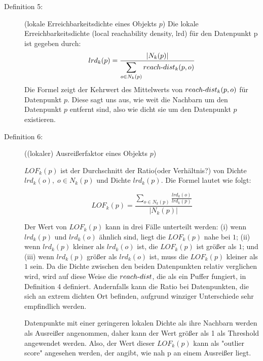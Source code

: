 \begin{description}
                    \item[Definition 5:]{(lokale Erreichbarkeitsdichte eines Objekts $p$)
                        Die lokale Erreichbarkeitsdichte (local reachability density, lrd) für den Datenpunkt p ist gegeben durch:
                        \begin{equation}
                            lrd_{k}(p) = \frac{|N_{k}(p)|}{\displaystyle \sum_{o \in N_{k}(p)}reach \text - dist_{k}(p, o)}
                        \end{equation}
                        Die Formel zeigt der Kehrwert des Mittelwerts von $reach \text - dist_{k}(p, o)$ für Datenpunkt $p$. Diese sagt uns aus, wie weit die Nachbarn um den Datenpunkt $p$ entfernt sind, also wie dicht sie um den Datenpunkt $p$  existieren.
                    }
                    
                    \item[Definition 6:]{((lokaler) Ausreißerfaktor eines Objekts $p$)
                    
                        $LOF_k(p)$ ist der Durchschnitt der Ratio(oder Verhältnis?) von Dichte $lrd_k(o), \; o \in N_k(p)$ und Dichte $lrd_k(p)$. Die Formel lautet wie folgt:

                        \begin{equation}
                            \label{eqn:LOF_k(p)}
                            LOF_k(p)=\frac{\displaystyle\sum_{o\in N_k(p)}{\frac{lrd_k(o)}{lrd_k(p)}}}{|N_k(p)|}
                        \end{equation}

                        Der Wert von $LOF_k(p)$ kann in drei Fälle unterteilt werden: (i) wenn $lrd_k(p)$ und $lrd_k(o)$ ähnlich sind, liegt die $LOF_k(p)$ nahe bei $1$; (ii) wenn $lrd_k(p)$ kleiner als $lrd_k(o)$ ist, die $LOF_k(p)$ ist größer als $1$; und (iii) wenn $lrd_k(p)$ größer als $lrd_k(o)$ ist, muss die $LOF_k(p)$ kleiner als $1$ sein. Da die Dichte zwischen den beiden Datenpunkten relativ verglichen wird, wird auf diese Weise die $reach \text-dist$, die als ein Puffer fungiert, in Definition 4 definiert. Andernfalls kann die Ratio bei Datenpunkten, die sich an extrem dichten Ort befinden, aufgrund winziger Unterschiede sehr empfindlich werden.

                        Datenpunkte mit einer geringeren lokalen Dichte als ihre Nachbarn werden als Ausreißer angenommen, daher kann der Wert größer als 1 als Threshold angewendet werden. Also, der Wert dieser $LOF_k(p)$ kann als "outlier score" angesehen werden, der angibt, wie nah p an einem Ausreißer liegt.
                    }
                \end{description}


